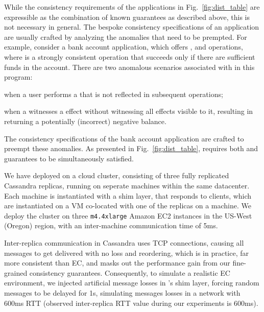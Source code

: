 %
While the consistency requirements of the applications in
Fig.~\ref{fig:dist_table} are expressible as the combination of known
guarantees as described above, this is not necessary in general. The
bespoke consistency specifications of an application are usually
crafted by analyzing the anomalies that need to be prempted.  For
example, consider a bank account application, which offers \dRV{},
\wdRV{} and \gbRV{} operations, where \wdRV{} is a strongly consistent
operation that succeeds only if there are sufficient funds in the
account. There are two anomalous scenarios associated with \gbRV{} in
this program: \begin{enumerate*}[label=(\roman*)] \item when a user
      performs a \dRV{} that is not reflected in subsequent \gbRV{}
    operations; \item when a \gbRV{} witnesses a \wdRV{} effect
without witnessing all \dRV{} effects visible to it,  resulting in
\gbRV{} returning a potentially (incorrect) negative balance.
\end{enumerate*} The consistency specifications of  the bank account
application are crafted to preempt these anomalies. As presented in
Fig.~\ref{fig:dist_table}, \gbRV{} requires both \rmwCTRT{} and
\visCTRT{} guarantees to be simultaneously satisfied.


We have deployed \tool on a cloud cluster,
consisting of three fully replicated Cassandra replicas, running on
seperate machines within the same
datacenter. 
Each machine is instantiated with a
\tool shim layer, that responds to clients,  
 which are instantiated on a VM 
co-located with one of the replicas on a machine.
We deploy the cluster on three \texttt{m4.4xlarge} Amazon EC2 instances
in the US-West (Oregon) region, with an inter-machine communication time of 5ms.

Inter-replica communication in Cassandra uses TCP connections, causing
all messages to get delivered with no loss and reordering, which is in
practice, far more consistent than EC, and masks out the performance
gain from our fine-grained consistency guarantees.  Consequently, to
simulate a realistic EC environment, we injected artificial message
losses in \tool's shim layer, forcing random messages to be delayed
for 1s, simulating messages losses in a network with 600ms RTT
(observed inter-replica RTT value during our experiments is 600ms).

